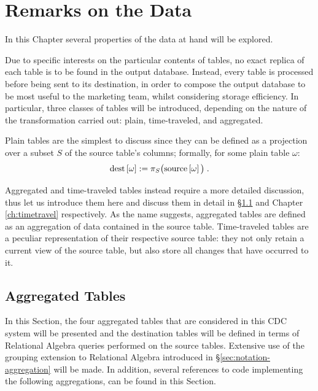 \chapter{Remarks on the Data}
\label{ch:data}

In this Chapter several properties of the data at hand will be explored.


Due to specific interests on the particular contents of tables, no exact replica of each table is to be found in the output database.
Instead, every table is processed before being sent to its destination, in order to compose the output database to be most useful to the marketing team, whilst considering storage efficiency.
In particular, three classes of tables will be introduced, depending on the nature of the transformation carried out: plain, time-traveled, and aggregated.

Plain tables are the simplest to discuss since they can be defined as a projection over a subset $S$ of the source table's columns; formally, for some plain table $\omega$:
$$
\text{dest}\left[{\omega}\right] := \pi_{S} \big( \text{source}\left[{\omega}\right] \big) \; .
$$

Aggregated and time-traveled tables instead require a more detailed discussion, thus let us introduce them here and discuss them in detail in \S \ref{sec:aggregations} and Chapter \ref{ch:timetravel} respectively.
As the name suggests, aggregated tables are defined as an aggregation of data contained in the source table.
Time-traveled tables are a peculiar representation of their respective source table: they not only retain a current view of the source table, but also store all changes that have occurred to it.


\section{Aggregated Tables}
\label{sec:aggregations}

In this Section, the four aggregated tables that are considered in this CDC system will be presented and the destination tables will be defined in terms of Relational Algebra queries performed on the source tables.
Extensive use of the grouping extension to Relational Algebra introduced in \S \ref{sec:notation-aggregation} will be made.
In addition, several references to code implementing the following aggregations, can be found in this Section.

